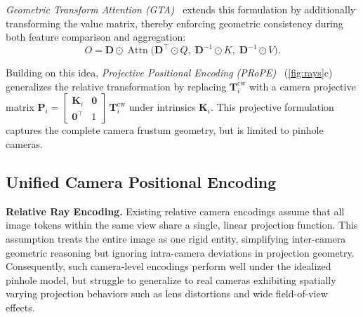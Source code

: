 \emph{Geometric Transform Attention (GTA)}~\cite{miyato2023gta} extends this formulation by additionally transforming the value matrix, thereby enforcing geometric consistency during both feature comparison and aggregation:
\begin{equation}
{O}
= \mathbf{D} \odot \operatorname{Attn}\big(\mathbf{D}^{\!\top}\!\odot {Q},\; \mathbf{D}^{-1}\!\odot {K},\; \mathbf{D}^{-1}\!\odot {V}\big).
\label{eq:gta}
\end{equation}

Building on this idea, \emph{Projective Positional Encoding (PRoPE)}~\cite{li2025cameras} (\cref{fig:rays}c) generalizes the relative transformation by replacing \(\mathbf{T}^{\textrm{cw}}_{i}\) with a camera projective matrix \(\mathbf{P}_{i} = \left[\begin{smallmatrix} \mathbf{K}_{i} & \bm{0} \\ \bm{0}^\top & 1 \end{smallmatrix}\right]\,\mathbf{T}^{\textrm{cw}}_{i}\) under intrinsics \(\mathbf{K}_{i}\).
This projective formulation captures the complete camera frustum geometry, but is limited to pinhole cameras.

\subsection{Unified Camera Positional Encoding}
\label{sec:ucpe}




\noindent\textbf{Relative Ray Encoding.}
Existing relative camera encodings assume that all image tokens within the same view share a single, linear projection function.
This assumption treats the entire image as one rigid entity, simplifying inter-camera geometric reasoning but ignoring intra-camera deviations in projection geometry.
Consequently, such camera-level encodings perform well under the idealized pinhole model, but struggle to generalize to real cameras exhibiting spatially varying projection behaviors such as lens distortions and wide field-of-view effects.

